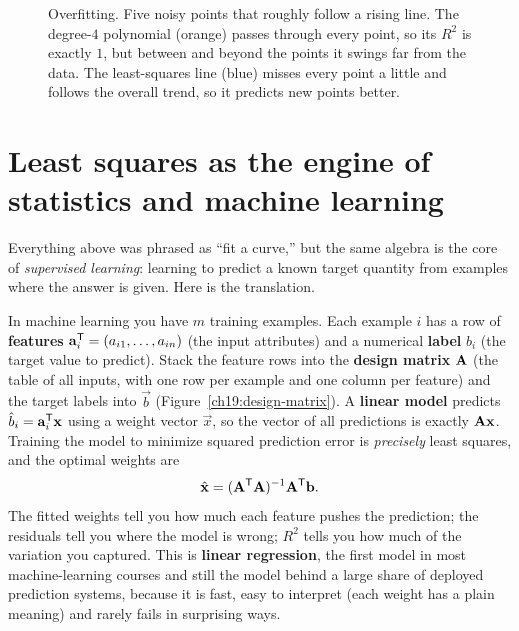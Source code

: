 \begin{figure}[htbp]
\centering
{}
\caption{Overfitting. Five noisy points that roughly follow a rising line. The degree-$4$
polynomial (orange) passes through every point, so its $R^2$ is exactly $1$, but between and beyond
the points it swings far from the data. The least-squares line (blue) misses every point a little
and follows the overall trend, so it predicts new points better.}
\label{ch19:overfit}
\end{figure}

\section{Least squares as the engine of statistics and machine learning}

Everything above was phrased as ``fit a curve,'' but the same algebra is the core of
\emph{supervised learning}: learning to predict a known target quantity from examples where the
answer is given. Here is the translation.

In machine learning you have $m$ training examples. Each example $i$ has a row of
\textbf{features} $\mathbf{a}_i^{\mathsf{T}} = (a_{i1},\dots,a_{in})$ (the input attributes) and a numerical
\textbf{label} $b_i$ (the target value to predict). Stack the feature rows into the \textbf{design
matrix} $\mathbf{A}$ (the table of all inputs, with one row per example and one column per feature)
and the target labels into $\vec{b}$ (Figure~\ref{ch19:design-matrix}). A \textbf{linear model}
predicts $\hat{b}_i=\mathbf{a}_i^{\mathsf{T}}\mathbf{x}$ using a weight vector $\vec{x}$, so the vector of all
predictions is exactly $\mathbf{A}\mathbf{x}$. Training the model to minimize
squared prediction error is \emph{precisely} least squares, and the optimal weights are
\[
  \hat{\mathbf{x}} = (\mathbf{A}^{\mathsf{T}}\mathbf{A})^{-1}\mathbf{A}^{\mathsf{T}}\mathbf{b}.
\]
The fitted weights tell you how much each feature pushes the prediction; the residuals tell you
where the model is wrong; $R^2$ tells you how much of the variation you captured. This is
\textbf{linear regression}, the first model in most machine-learning courses and still the model
behind a large share of deployed prediction systems, because it is fast, easy to interpret (each
weight has a plain meaning) and rarely fails in surprising ways.


